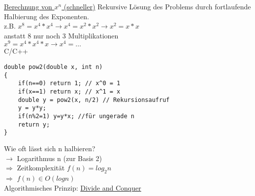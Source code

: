 \underline{Berechnung von $x^n$ (schneller)}
Rekursive Lösung des Problems durch fortlaufende Halbierung des Exponenten. \\
z.B. $x^8 = x^4*x^4 \rightarrow x^4=x^2*x^2 \rightarrow x^2=x*x$ \\
anstatt 8 nur noch 3 Multiplikationen \\
$x^9 = x^4*x^4*x \rightarrow x^4=\dots$ \\
C/C++
\begin{lstlisting}
double pow2(double x, int n)
{
	if(n==0) return 1; // x^0 = 1
	if(x==1) return x; // x^1 = x
	double y = pow2(x, n/2) // Rekursionsaufruf
	y = y*y;
	if(n%2=1) y=y*x; //für ungerade n
	return y;
}
\end{lstlisting}
Wie oft lässt sich n halbieren? \\
$\rightarrow$ Logarithmus n (zur Basis 2) \\
$\Rightarrow$ Zeitkomplexität $f(n) = log_2n$ \\
$\Rightarrow$ $f(n) \in O(log n)$ \\
Algorithmisches Prinzip: \underline{\glqq Divide and Conquer\grqq}
